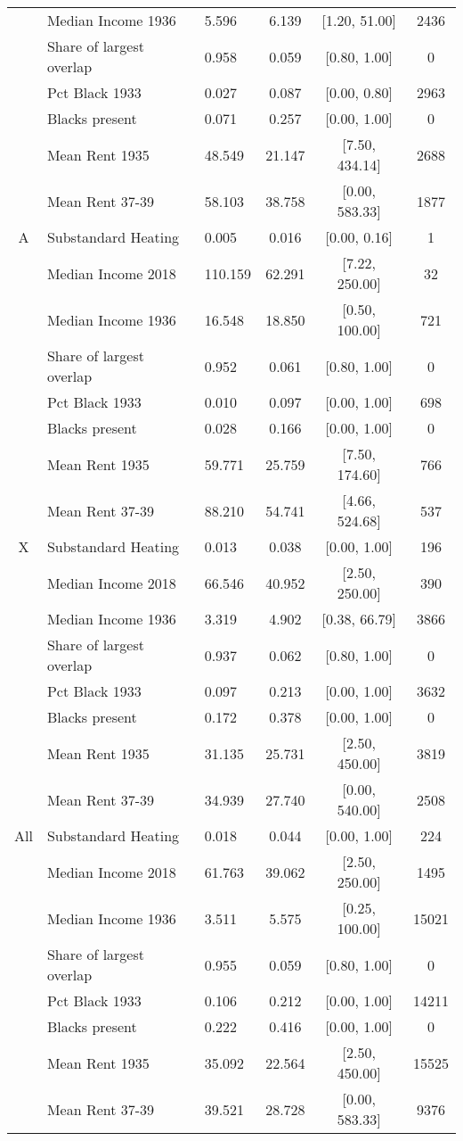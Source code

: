 \documentclass[
]{article}
\begin{document}
\begin{table}
{\begin{tabular}[t]{cllccc}
 & Median Income 1936 & 5.596 & 6.139 & [1.20, 51.00] & 2436\\
 & Share of largest overlap & 0.958 & 0.059 & [0.80, 1.00] & 0\\
 & Pct Black 1933 & 0.027 & 0.087 & [0.00, 0.80] & 2963\\
 & Blacks present & 0.071 & 0.257 & [0.00, 1.00] & 0\\
 & Mean Rent 1935 & 48.549 & 21.147 & [7.50, 434.14] & 2688\\
 & Mean Rent 37-39 & 58.103 & 38.758 & [0.00, 583.33] & 1877\\
A & Substandard Heating & 0.005 & 0.016 & [0.00, 0.16] & 1\\
 & Median Income 2018 & 110.159 & 62.291 & [7.22, 250.00] & 32\\
 & Median Income 1936 & 16.548 & 18.850 & [0.50, 100.00] & 721\\
 & Share of largest overlap & 0.952 & 0.061 & [0.80, 1.00] & 0\\
 & Pct Black 1933 & 0.010 & 0.097 & [0.00, 1.00] & 698\\
 & Blacks present & 0.028 & 0.166 & [0.00, 1.00] & 0\\
 & Mean Rent 1935 & 59.771 & 25.759 & [7.50, 174.60] & 766\\
 & Mean Rent 37-39 & 88.210 & 54.741 & [4.66, 524.68] & 537\\
X & Substandard Heating & 0.013 & 0.038 & [0.00, 1.00] & 196\\
 & Median Income 2018 & 66.546 & 40.952 & [2.50, 250.00] & 390\\
 & Median Income 1936 & 3.319 & 4.902 & [0.38, 66.79] & 3866\\
 & Share of largest overlap & 0.937 & 0.062 & [0.80, 1.00] & 0\\
 & Pct Black 1933 & 0.097 & 0.213 & [0.00, 1.00] & 3632\\
 & Blacks present & 0.172 & 0.378 & [0.00, 1.00] & 0\\
 & Mean Rent 1935 & 31.135 & 25.731 & [2.50, 450.00] & 3819\\
 & Mean Rent 37-39 & 34.939 & 27.740 & [0.00, 540.00] & 2508\\
All & Substandard Heating & 0.018 & 0.044 & [0.00, 1.00] & 224\\
 & Median Income 2018 & 61.763 & 39.062 & [2.50, 250.00] & 1495\\
 & Median Income 1936 & 3.511 & 5.575 & [0.25, 100.00] & 15021\\
 & Share of largest overlap & 0.955 & 0.059 & [0.80, 1.00] & 0\\
 & Pct Black 1933 & 0.106 & 0.212 & [0.00, 1.00] & 14211\\
 & Blacks present & 0.222 & 0.416 & [0.00, 1.00] & 0\\
 & Mean Rent 1935 & 35.092 & 22.564 & [2.50, 450.00] & 15525\\
 & Mean Rent 37-39 & 39.521 & 28.728 & [0.00, 583.33] & 9376\\
\bottomrule
\end{tabular}}
\end{table}
\end{document}
